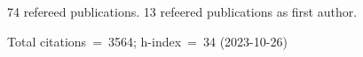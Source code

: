 74 refereed publications. 13 refeered publications as first author.

Total citations~=~3564; h-index~=~34 (2023-10-26)